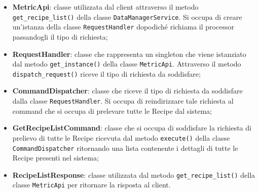     \begin{itemize}
        \item \textbf{MetricApi}: classe utilizzata dal client attraverso il metodo \texttt{get\_recipe\_list()} della classe \texttt{DataManagerService}. Si occupa di creare un'istanza della classe \texttt{RequestHandler} dopodiché richiama il processor passandogli il tipo di richiesta;
        \item \textbf{RequestHandler}: classe che rappresenta un singleton che viene istanziato dal metodo \texttt{get\_instance()} della classe \texttt{MetricApi}. Attraverso il metodo \texttt{dispatch\_request()} riceve il tipo di richiesta da soddisfare;
        \item \textbf{CommandDispatcher}: classe che riceve il tipo di richiesta da soddisfare dalla classe \texttt{RequestHandler}. Si occupa di reindirizzare tale richiesta al command che si occupa di prelevare tutte le Recipe dal sistema;
        \item \textbf{GetRecipeListCommand}: classe che si occupa di soddisfare la richiesta di prelievo di tutte le Recipe ricevuta dal metodo \texttt{execute()} della classe \texttt{CommandDispatcher} ritornando una lista contenente i dettagli di tutte le Recipe presenti nel sistema;
        \item \textbf{RecipeListResponse}: classe utilizzata dal metodo \texttt{get\_recipe\_list()} della classe \texttt{MetricApi} per ritornare la risposta al client.
    \end{itemize}

